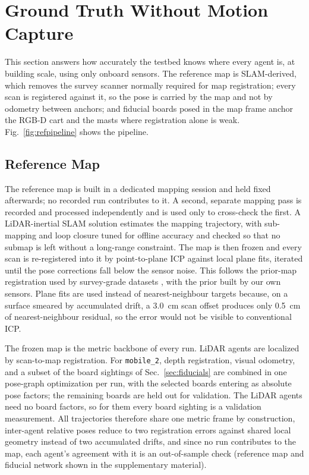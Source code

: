 \documentclass[journal]{IEEEtran}
\begin{document}


\section{Ground Truth Without Motion Capture}
\label{sec:gt}
This section answers how accurately the testbed knows where every
agent is, at building scale, using only onboard sensors. The reference
map is SLAM-derived, which removes the survey scanner normally required
for map registration; every scan is registered against it, so the pose
is carried by the map and not by odometry between anchors; and
fiducial boards posed in the map frame anchor the RGB-D cart and the
masts where registration alone is weak. Fig.~\ref{fig:refpipeline}
shows the pipeline.



\subsection{Reference Map}
\label{sec:map}
The reference map is built in a dedicated mapping session and held
fixed afterwards; no recorded run contributes to it. A second,
separate mapping pass is recorded and processed independently and is
used only to cross-check the first. A LiDAR-inertial SLAM solution
\cite{glim} estimates the mapping trajectory, with sub-mapping and
loop closure tuned for offline accuracy and checked so that no submap
is left without a long-range constraint. The map is then frozen and
every scan is re-registered into it by point-to-plane ICP against
local plane fits, iterated until the pose corrections fall below the
sensor noise. This follows the prior-map registration used by
survey-grade datasets \cite{newercollege,oxfordspires,lamar}, with the
prior built by our own sensors. Plane fits are used instead of
nearest-neighbour targets because, on a surface smeared by accumulated
drift, a \SI{3.0}{\centi\metre} scan offset produces only
\SI{0.5}{\centi\metre} of nearest-neighbour residual, so the error
would not be visible to conventional ICP.

The frozen map is the metric backbone of every run. LiDAR agents are
localized by scan-to-map registration. For \texttt{mobile\_2}, depth
registration, visual odometry, and a subset of the board sightings of
Sec.~\ref{sec:fiducials} are combined in one pose-graph optimization
per run, with the selected boards entering as absolute pose factors;
the remaining boards are held out for validation. The LiDAR agents
need no board factors, so for them every board sighting is a
validation measurement. All trajectories therefore share one metric
frame by construction, inter-agent relative poses reduce to two
registration errors against shared local geometry instead of two
accumulated drifts, and since no run contributes to the map, each
agent's agreement with it is an out-of-sample check (reference map and
fiducial network shown in the supplementary material).
\end{document}
